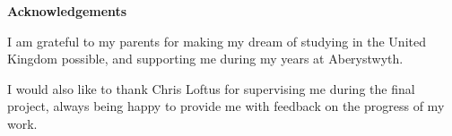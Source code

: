 \thispagestyle{empty}

\begin{center}
    {\LARGE\bf Acknowledgements}
\end{center}

I am grateful to my parents for making my dream of studying in the United Kingdom
possible, and supporting me during my years at Aberystwyth.

I would also like to thank Chris Loftus for supervising me during the final
project, always being happy to provide me with feedback on the progress of my
work.
